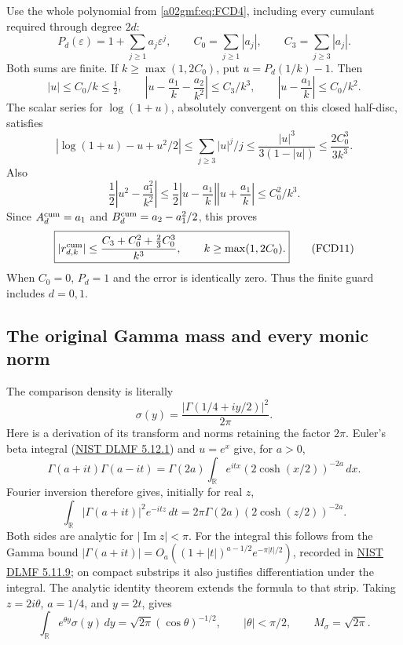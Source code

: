 \documentclass[11pt,a4paper]{article}
\begin{document}
Use the whole polynomial from \eqref{a02gmf:eq:FCD4}, including every
cumulant required through degree \(2d\):
\[
 P_d(\varepsilon)=1+\sum_{j\ge1}a_j\varepsilon^j,\qquad
 C_0=\sum_{j\ge1}|a_j|,\qquad C_3=\sum_{j\ge3}|a_j|.
\]
Both sums are finite. If \(k\ge\max(1,2C_0)\), put
\(u=P_d(1/k)-1\). Then
\[
 |u|\le C_0/k\le\tfrac12,\qquad
 \left|u-\frac{a_1}k-\frac{a_2}{k^2}\right|
       \le C_3/k^3,\qquad
 \left|u-\frac{a_1}k\right|\le C_0/k^2 .
\]
The scalar series for \(\log(1+u)\), absolutely convergent on this
closed half-disc, satisfies
\[
 |\log(1+u)-u+u^2/2|
   \le\sum_{j\ge3}|u|^j/j
   \le\frac{|u|^3}{3(1-|u|)}
   \le\frac{2C_0^3}{3k^3}.
\]
Also
\[
 \frac12\left|u^2-\frac{a_1^2}{k^2}\right|
 \le\frac12\left|u-\frac{a_1}k\right|
                  \left|u+\frac{a_1}k\right|
 \le C_0^2/k^3 .
\]
Since \(A_d^{\rm cum}=a_1\) and
\(B_d^{\rm cum}=a_2-a_1^2/2\), this proves
\begin{equation}
 \boxed{\displaystyle
 |r_{d,k}^{\rm cum}|
 \le \frac{C_3+C_0^2+\tfrac23 C_0^3}{k^3},
 \qquad k\ge\max(1,2C_0).}
 \tag{FCD11}\label{a02gmf:eq:FCD11}
\end{equation}
When \(C_0=0\), \(P_d=1\) and the error is identically zero.
Thus the finite guard includes \(d=0,1\).

\subsection{The original Gamma mass and every monic norm}

The comparison density is literally
\[
 \sigma(y)=\frac{|\Gamma(1/4+iy/2)|^2}{2\pi}.
\]
Here is a derivation of its transform and norms retaining the factor
\(2\pi\). Euler's beta integral
(\href{https://dlmf.nist.gov/5.12.E1}{NIST DLMF 5.12.1})
and \(u=e^x\) give, for \(a>0\),
\[
 \Gamma(a+it)\Gamma(a-it)
   =\Gamma(2a)\int_{\mathbb R}
           e^{itx}(2\cosh(x/2))^{-2a}\,dx.
\]
Fourier inversion therefore gives, initially for real \(z\),
\[
 \int_{\mathbb R}|\Gamma(a+it)|^2e^{-itz}\,dt
        =2\pi\Gamma(2a)(2\cosh(z/2))^{-2a}.
\]
Both sides are analytic for \(|\operatorname{Im}z|<\pi\).
For the integral this follows from the Gamma bound
\(|\Gamma(a+it)|=O_a((1+|t|)^{a-1/2}e^{-\pi|t|/2})\),
recorded in
\href{https://dlmf.nist.gov/5.11.E9}{NIST DLMF 5.11.9};
on compact substrips it also justifies differentiation under the integral.
The analytic identity theorem extends the formula to that strip.
Taking \(z=2i\theta\), \(a=1/4\), and \(y=2t\), gives
\begin{equation}
 \int_{\mathbb R}e^{\theta y}\sigma(y)\,dy
       =\sqrt{2\pi}(\cos\theta)^{-1/2},\qquad
 |\theta|<\pi/2,\qquad M_\sigma=\sqrt{2\pi}.
 \tag{FCD12}\label{a02gmf:eq:FCD12}
\end{equation}
\end{document}
